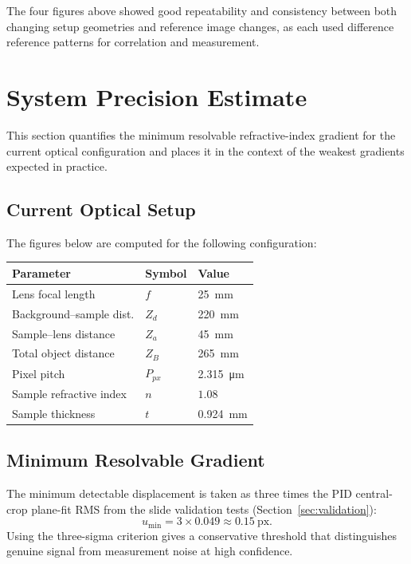 \documentclass[11pt]{article}
\begin{document}
The four figures above showed good repeatability and consistency between both changing 
setup geometries and reference image changes, as each used difference reference patterns for correlation and measurement.

\section{System Precision Estimate}
\label{sec:precision}

This section quantifies the minimum resolvable refractive-index gradient for
the current optical configuration and places it in the context of the weakest
gradients expected in practice.

\subsection{Current Optical Setup}

The figures below are computed for the following configuration:

\begin{center}
\begin{tabular}{lll}
  \toprule
  \rowcolor{accentlight} \textbf{Parameter} & \textbf{Symbol} & \textbf{Value} \\
  \midrule
  Lens focal length        & $f$       & \SI{25}{mm} \\
  Background--sample dist. & $Z_d$     & \SI{220}{mm} \\
  Sample--lens distance    & $Z_a$     & \SI{45}{mm} \\
  Total object distance    & $Z_B$     & \SI{265}{mm} \\
  Pixel pitch              & $P_{px}$  & \SI{2.315}{\micro\metre} \\
  Sample refractive index  & $n$       & $1.08$ \\
  Sample thickness         & $t$       & \SI{0.924}{mm} \\
  \bottomrule
\end{tabular}
\end{center}

\subsection{Minimum Resolvable Gradient}

The minimum detectable displacement is taken as three times the PID
central-crop plane-fit RMS from the slide validation tests
(Section~\ref{sec:validation}):
\begin{equation}
  u_{\min} = 3 \times 0.049 \approx 0.15~\text{px}.
\end{equation}
Using the three-sigma criterion gives a conservative threshold that
distinguishes genuine signal from measurement noise at high confidence.
\end{document}
